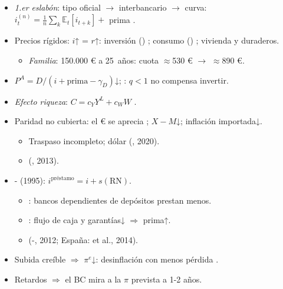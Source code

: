 \documentclass{article}
\begin{document}
\begin{columnas}
\begin{itemize}
\item \emph{1.er eslabón}: tipo oficial $\to$ interbancario $\to$ curva: $i^{(n)}_t=\frac1n\sum_k\mathbb E_t[i_{t+k}]+$ prima .
\end{itemize}
\begin{itemize}
\item Precios rígidos: $i$↑ = $r$↑: inversión () ; consumo () ; vivienda y duraderos.
  \begin{itemize}
  \item \emph{Familia}: 150.000 € a 25~años: cuota $\approx$530 € $\to$ $\approx$890 €.
  \end{itemize}
\end{itemize}
\begin{itemize}
\item $P^A=D/(i+\text{prima}-\gamma_D)$↓; : $q<1$ no compensa invertir.
\item \emph{Efecto riqueza}: $C=c_YY^L+c_WW$ .
\end{itemize}
\begin{itemize}
\item Paridad no cubierta: el € se aprecia ; $X-M$↓; inflación importada↓.
  \begin{itemize}
  \item Traspaso incompleto; dólar (, 2020).
  \item {} (, 2013).
  \end{itemize}
\end{itemize}
\begin{itemize}
\item {}- (1995): $i^{\text{préstamo}}=i+s(\mathrm{RN})$.
  \begin{itemize}
  \item {}: bancos dependientes de depósitos prestan menos.
  \item {}: flujo de caja y garantías↓ $\Rightarrow$ prima↑.
  \item {} (-, 2012; España:  et al., 2014).
  \end{itemize}
\end{itemize}
\begin{itemize}
\item Subida creíble $\Rightarrow$ $\pi^e$↓: desinflación con menos pérdida .
\item Retardos $\Rightarrow$ el BC mira a la $\pi$ prevista a 1-2 años.
\end{itemize}


\end{columnas}
\end{document}

